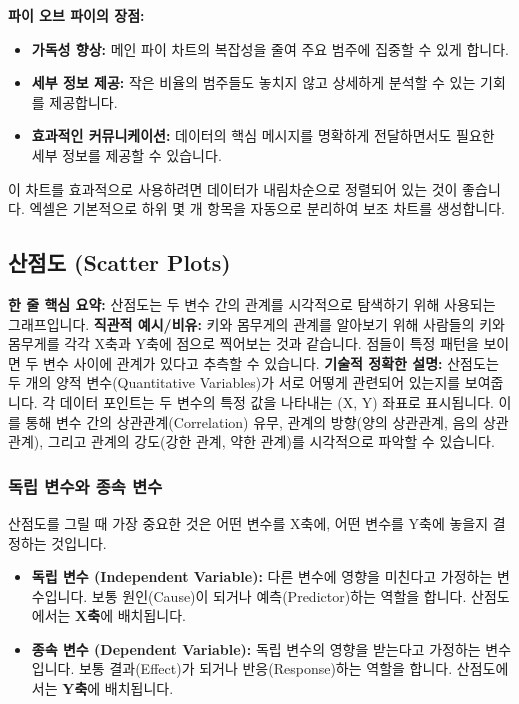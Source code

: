 \documentclass[11pt,a4paper]{book}
\theoremstyle{definition}
\begin{document}
\textbf{파이 오브 파이의 장점:}
\begin{itemize}
    \item \textbf{가독성 향상:} 메인 파이 차트의 복잡성을 줄여 주요 범주에 집중할 수 있게 합니다.
    \item \textbf{세부 정보 제공:} 작은 비율의 범주들도 놓치지 않고 상세하게 분석할 수 있는 기회를 제공합니다.
    \item \textbf{효과적인 커뮤니케이션:} 데이터의 핵심 메시지를 명확하게 전달하면서도 필요한 세부 정보를 제공할 수 있습니다.
\end{itemize}
이 차트를 효과적으로 사용하려면 데이터가 내림차순으로 정렬되어 있는 것이 좋습니다. 엑셀은 기본적으로 하위 몇 개 항목을 자동으로 분리하여 보조 차트를 생성합니다.


\subsection{산점도 (Scatter Plots)}

\begin{conceptbox}
\textbf{한 줄 핵심 요약:} 산점도는 두 변수 간의 관계를 시각적으로 탐색하기 위해 사용되는 그래프입니다.
\textbf{직관적 예시/비유:} 키와 몸무게의 관계를 알아보기 위해 사람들의 키와 몸무게를 각각 X축과 Y축에 점으로 찍어보는 것과 같습니다. 점들이 특정 패턴을 보이면 두 변수 사이에 관계가 있다고 추측할 수 있습니다.
\textbf{기술적 정확한 설명:} 산점도는 두 개의 양적 변수(Quantitative Variables)가 서로 어떻게 관련되어 있는지를 보여줍니다. 각 데이터 포인트는 두 변수의 특정 값을 나타내는 (X, Y) 좌표로 표시됩니다. 이를 통해 변수 간의 상관관계(Correlation) 유무, 관계의 방향(양의 상관관계, 음의 상관관계), 그리고 관계의 강도(강한 관계, 약한 관계)를 시각적으로 파악할 수 있습니다.
\end{conceptbox}

\subsubsection{독립 변수와 종속 변수}
산점도를 그릴 때 가장 중요한 것은 어떤 변수를 X축에, 어떤 변수를 Y축에 놓을지 결정하는 것입니다.
\begin{itemize}
    \item \textbf{독립 변수 (Independent Variable):} 다른 변수에 영향을 미친다고 가정하는 변수입니다. 보통 원인(Cause)이 되거나 예측(Predictor)하는 역할을 합니다. 산점도에서는 \textbf{X축}에 배치됩니다.
    \item \textbf{종속 변수 (Dependent Variable):} 독립 변수의 영향을 받는다고 가정하는 변수입니다. 보통 결과(Effect)가 되거나 반응(Response)하는 역할을 합니다. 산점도에서는 \textbf{Y축}에 배치됩니다.
\end{itemize}
\end{document}
